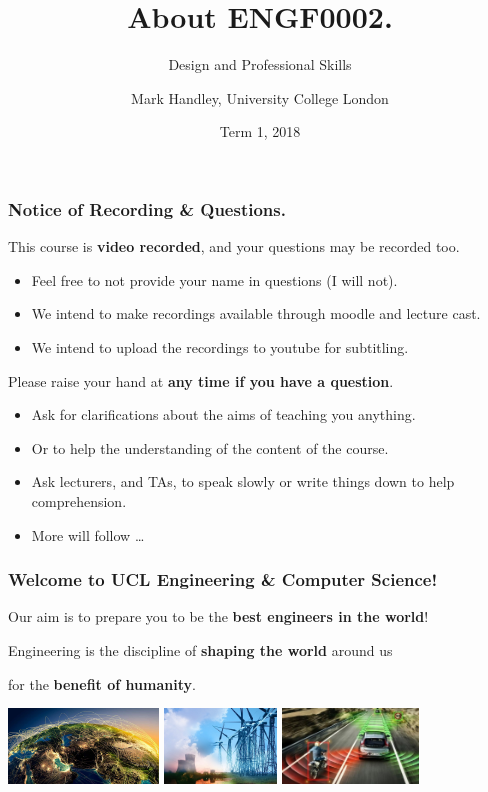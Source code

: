\documentclass{beamer} %
\author{Mark Handley, University College London}
\title{About ENGF0002.}
\subtitle{Design and Professional Skills }
\date{Term 1, 2018}
\newcommand\emc[1]{\textcolor{midred}{\textbf{#1}}}
\begin{document}
\nobibliography*


\frame{
\titlepage
}

\begin{frame}
\frametitle{Notice of Recording \& Questions.}

This course is \emc{video recorded}, and your questions may be recorded too. 
\begin{itemize}
    \item Feel free to not provide your name in questions (I will not).
    \item We intend to make recordings available through moodle and lecture cast.
    \item We intend to upload the recordings to youtube for subtitling.
\end{itemize}

\vspace{3mm}
Please raise your hand at \emc{any time if you have a question}.
\begin{itemize}
    \item Ask for clarifications about the aims of teaching you anything.
    \item Or to help the understanding of the content of the course.
    \item Ask lecturers, and TAs, to speak slowly or write things down to help comprehension.
    \item More will follow \ldots
\end{itemize}

\end{frame} 


\begin{frame}
\frametitle{Welcome to UCL Engineering \& Computer Science!}

Our aim is to prepare you to be the \emc{best engineers in the world}!

\vspace{10mm}
Engineering is the discipline of \emc{shaping the world} around us 

for the \emc{benefit of humanity}.

\vspace{5mm}
\centering
\includegraphics[height=20mm]{img/internet.jpg} \quad
\includegraphics[height=20mm]{img/power.jpg} \quad
\includegraphics[height=20mm]{img/cars.jpg}

\end{frame}
\end{document}
